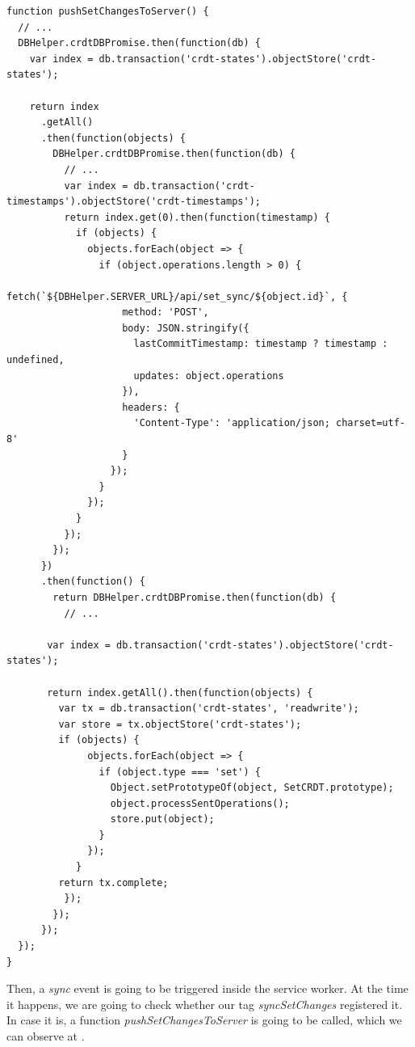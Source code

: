 \begin{lstlisting}[caption={A function \textit{pushSetChangesToServer} triggered every time when a client re-connects to the network.}, label={lst:dev12}]
function pushSetChangesToServer() {
  // ...
  DBHelper.crdtDBPromise.then(function(db) {
    var index = db.transaction('crdt-states').objectStore('crdt-states');

    return index
      .getAll()
      .then(function(objects) {
        DBHelper.crdtDBPromise.then(function(db) {
          // ...
          var index = db.transaction('crdt-timestamps').objectStore('crdt-timestamps');
          return index.get(0).then(function(timestamp) {
            if (objects) {
              objects.forEach(object => {
                if (object.operations.length > 0) {
                  fetch(`${DBHelper.SERVER_URL}/api/set_sync/${object.id}`, {
                    method: 'POST',
                    body: JSON.stringify({
                      lastCommitTimestamp: timestamp ? timestamp : undefined,
                      updates: object.operations
                    }),
                    headers: {
                      'Content-Type': 'application/json; charset=utf-8'
                    }
                  });
                }
              });
            }
          });
        });
      })
      .then(function() {
        return DBHelper.crdtDBPromise.then(function(db) {
          // ...

       var index = db.transaction('crdt-states').objectStore('crdt-states');

       return index.getAll().then(function(objects) {
         var tx = db.transaction('crdt-states', 'readwrite');
         var store = tx.objectStore('crdt-states');
         if (objects) {
              objects.forEach(object => {
                if (object.type === 'set') {
                  Object.setPrototypeOf(object, SetCRDT.prototype);
                  object.processSentOperations();
                  store.put(object);
                }
              });
            }
         return tx.complete;
          });
        });
      });
  });
}
\end{lstlisting}

Then, a \textit{sync} event is going to be triggered inside the service worker. At the time it happens, we are going to check whether our tag \textit{syncSetChanges} registered it. In case it is, a function \textit{pushSetChangesToServer} is going to be called, which we can observe at . 

